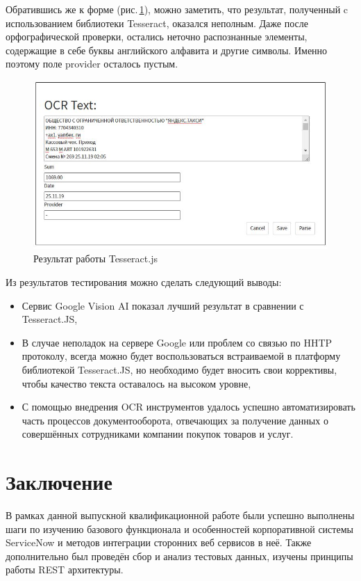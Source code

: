 \documentclass[14pt]{mmcs_article}
\begin{document}
Обратившись же к форме (рис.\,\ref{stud:fig:1235}), можно заметить, что результат, полученный c использованием библиотеки Tesseract, оказался неполным. Даже после орфографической проверки, остались неточно распознанные элементы, содержащие в себе буквы английского алфавита и другие символы. Именно поэтому поле provider осталось пустым. 
\begin{figure}[H]
  \centering
  \includegraphics[scale=0.8]{Res2.JPG}
  \caption{Результат работы Tesseract.js}\label{stud:fig:1235}
\end{figure}
Из результатов тестирования можно сделать следующий выводы:
\begin{itemize}
\item Сервис Google Vision AI показал лучший результат в сравнении с Tesseract.JS,
\item В случае неполадок на сервере Google или проблем со связью по HHTP протоколу, всегда можно будет воспользоваться встраиваемой в платформу библиотекой Tesseract.JS, но необходимо будет вносить свои коррективы, чтобы качество текста оставалось на высоком уровне,
\item С помощью внедрения OCR инструментов удалось успешно автоматизировать часть процессов документооборота, отвечающих за получение данных о совершённых сотрудниками компании покупок товаров и услуг.
\end{itemize}

\newpage
{}
\section*{Заключение}
В рамках данной выпускной квалификационной работе были успешно выполнены шаги по изучению базового функционала и особенностей корпоративной системы ServiceNow и методов интеграции сторонних веб сервисов в неё. Также дополнительно был проведён сбор и анализ тестовых данных, изучены принципы работы REST архитектуры. 
\end{document}
